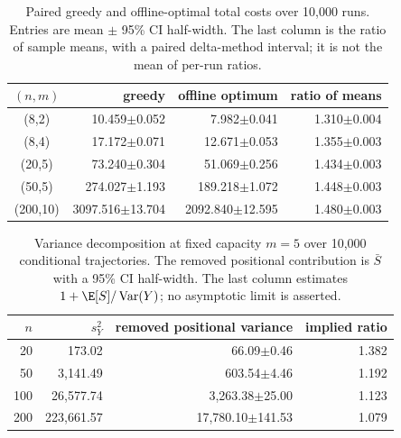 \begin{table}[t]
\centering
\caption{Paired greedy and offline-optimal total costs over 10,000 runs. Entries are mean $\pm$ 95\% CI half-width. The last column is the ratio of sample means, with a paired delta-method interval; it is not the mean of per-run ratios.}
\label{tab:offline}
\setlength{\tabcolsep}{4pt}
\begin{tabular}{crrr}
\toprule
$(n,m)$ & greedy & offline optimum & ratio of means \\
\midrule
(8,2) & 10.459$\pm$0.052 & 7.982$\pm$0.041 & 1.310$\pm$0.004 \\
(8,4) & 17.172$\pm$0.071 & 12.671$\pm$0.053 & 1.355$\pm$0.003 \\
(20,5) & 73.240$\pm$0.304 & 51.069$\pm$0.256 & 1.434$\pm$0.003 \\
(50,5) & 274.027$\pm$1.193 & 189.218$\pm$1.072 & 1.448$\pm$0.003 \\
(200,10) & 3097.516$\pm$13.704 & 2092.840$\pm$12.595 & 1.480$\pm$0.003 \\
\bottomrule
\end{tabular}
\end{table}

\begin{table}[t]
\centering
\caption{Variance decomposition at fixed capacity $m=5$ over 10,000 conditional trajectories. The removed positional contribution is $\bar S$ with a 95\% CI half-width. The last column estimates $1+\E[S]/\operatorname{Var}(Y)$; no asymptotic limit is asserted.}
\label{tab:variance}
\setlength{\tabcolsep}{4pt}
\begin{tabular}{rrrr}
\toprule
$n$ & $s_Y^2$ & removed positional variance & implied ratio \\
\midrule
20 & 173.02 & 66.09$\pm$0.46 & 1.382 \\
50 & 3,141.49 & 603.54$\pm$4.46 & 1.192 \\
100 & 26,577.74 & 3,263.38$\pm$25.00 & 1.123 \\
200 & 223,661.57 & 17,780.10$\pm$141.53 & 1.079 \\
\bottomrule
\end{tabular}
\end{table}
